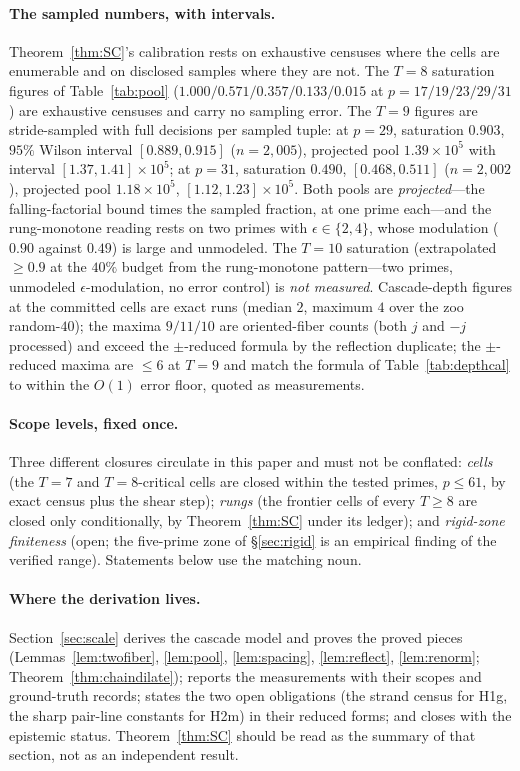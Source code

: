 \paragraph{The sampled numbers, with intervals.}
Theorem~\ref{thm:SC}'s calibration rests on exhaustive censuses where
the cells are enumerable and on disclosed samples where they are not.
The $T=8$ saturation figures of Table~\ref{tab:pool}
($1.000/0.571/0.357/0.133/0.015$ at $p=17/19/23/29/31$) are exhaustive
censuses and carry no sampling error. The $T=9$ figures are
stride-sampled with full decisions per sampled tuple: at $p=29$,
saturation $0.903$, $95\%$ Wilson interval $[0.889,0.915]$
($n=2{,}005$), projected pool $1.39\times10^5$ with interval
$[1.37,1.41]\times10^5$; at $p=31$, saturation $0.490$,
$[0.468,0.511]$ ($n=2{,}002$), projected pool $1.18\times10^5$,
$[1.12,1.23]\times10^5$. Both pools are \emph{projected}---the
falling-factorial bound times the sampled fraction, at one prime
each---and the rung-monotone reading rests on two primes with
$\epsilon\in\{2,4\}$, whose modulation ($0.90$ against $0.49$) is large
and unmodeled. The $T=10$ saturation (extrapolated $\ge 0.9$ at the
$40\%$ budget from the rung-monotone pattern---two primes, unmodeled
$\epsilon$-modulation, no error control) is \emph{not measured}. Cascade-depth figures at the
committed cells are exact runs (median $2$, maximum $4$ over the zoo
random-$40$); the maxima $9/11/10$ are oriented-fiber counts (both $j$
and $-j$ processed) and exceed the $\pm$-reduced formula by the reflection
duplicate; the $\pm$-reduced maxima are $\le 6$ at $T=9$ and match the
formula of Table~\ref{tab:depthcal} to within the $O(1)$ error floor,
quoted as measurements.

\paragraph{Scope levels, fixed once.}
Three different closures circulate in this paper and must not be
conflated: \emph{cells} (the $T=7$ and $T=8$-critical cells are closed
within the tested primes, $p\le 61$, by exact census plus the shear
step); \emph{rungs} (the frontier cells of every $T\ge 8$ are closed
only conditionally, by Theorem~\ref{thm:SC} under its ledger); and
\emph{rigid-zone finiteness} (open; the five-prime zone of
\S\ref{sec:rigid} is an empirical finding of the verified range).
Statements below use the matching noun.

\paragraph{Where the derivation lives.}
Section~\ref{sec:scale} derives the cascade model and proves the proved
pieces (Lemmas~\ref{lem:twofiber}, \ref{lem:pool}, \ref{lem:spacing},
\ref{lem:reflect}, \ref{lem:renorm}; Theorem~\ref{thm:chaindilate});
reports the measurements with their scopes and ground-truth records;
states the two open obligations (the strand census for H1g, the sharp
pair-line constants for H2m) in their reduced forms; and closes with
the epistemic status. Theorem~\ref{thm:SC} should be read as the
summary of that section, not as an independent result.
